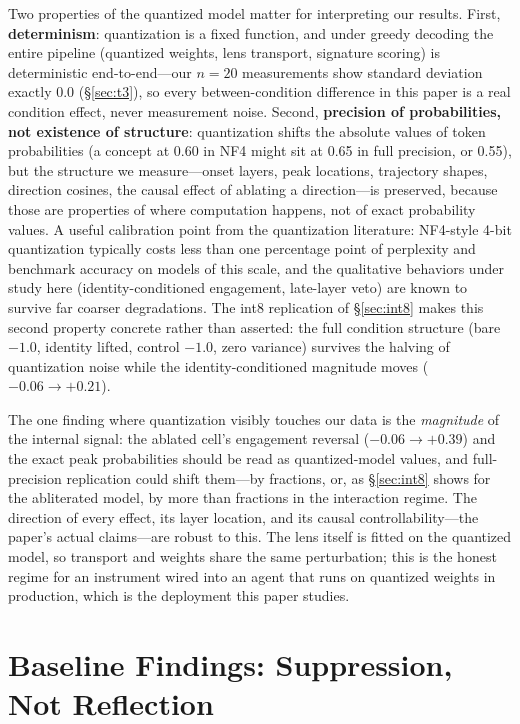 \documentclass[11pt,a4paper]{article}
\begin{document}
Two properties of the quantized model matter for interpreting our results. First, \textbf{determinism}: quantization is a fixed function, and under greedy decoding the entire pipeline (quantized weights, lens transport, signature scoring) is deterministic end-to-end---our $n=20$ measurements show standard deviation exactly 0.0 (\S\ref{sec:t3}), so every between-condition difference in this paper is a real condition effect, never measurement noise. Second, \textbf{precision of probabilities, not existence of structure}: quantization shifts the absolute values of token probabilities (a concept at 0.60 in NF4 might sit at 0.65 in full precision, or 0.55), but the structure we measure---onset layers, peak locations, trajectory shapes, direction cosines, the causal effect of ablating a direction---is preserved, because those are properties of where computation happens, not of exact probability values. A useful calibration point from the quantization literature: NF4-style 4-bit quantization typically costs less than one percentage point of perplexity and benchmark accuracy on models of this scale, and the qualitative behaviors under study here (identity-conditioned engagement, late-layer veto) are known to survive far coarser degradations. The int8 replication of \S\ref{sec:int8} makes this second property concrete rather than asserted: the full condition structure (bare $-1.0$, identity lifted, control $-1.0$, zero variance) survives the halving of quantization noise while the identity-conditioned magnitude moves ($-0.06 \to +0.21$).

The one finding where quantization visibly touches our data is the \emph{magnitude} of the internal signal: the ablated cell's engagement reversal ($-0.06 \to +0.39$) and the exact peak probabilities should be read as quantized-model values, and full-precision replication could shift them---by fractions, or, as \S\ref{sec:int8} shows for the abliterated model, by more than fractions in the interaction regime. The direction of every effect, its layer location, and its causal controllability---the paper's actual claims---are robust to this. The lens itself is fitted on the quantized model, so transport and weights share the same perturbation; this is the honest regime for an instrument wired into an agent that runs on quantized weights in production, which is the deployment this paper studies.

\section{Baseline Findings: Suppression, Not Reflection}
\label{sec:baseline}
\end{document}
